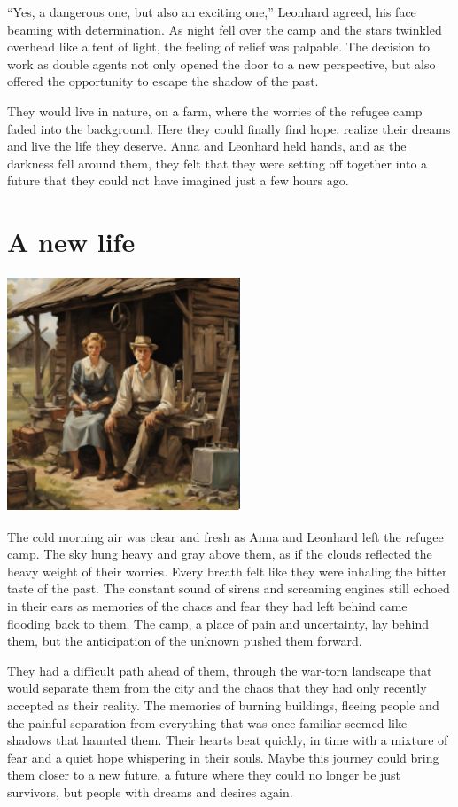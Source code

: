 \documentclass[
]{article}
\begin{document}
``Yes, a dangerous one, but also an exciting one,'' Leonhard agreed, his
face beaming with determination. As night fell over the camp and the
stars twinkled overhead like a tent of light, the feeling of relief was
palpable. The decision to work as double agents not only opened the door
to a new perspective, but also offered the opportunity to escape the
shadow of the past.

They would live in nature, on a farm, where the worries of the refugee
camp faded into the background. Here they could finally find hope,
realize their dreams and live the life they deserve. Anna and Leonhard
held hands, and as the darkness fell around them, they felt that they
were setting off together into a future that they could not have
imagined just a few hours ago.

\section{A new life}\label{a-new-life}

\includegraphics[width=2.73958in,height=2.77083in]{media/image0007.png}

The cold morning air was clear and fresh as Anna and Leonhard left the
refugee camp. The sky hung heavy and gray above them, as if the clouds
reflected the heavy weight of their worries. Every breath felt like they
were inhaling the bitter taste of the past. The constant sound of sirens
and screaming engines still echoed in their ears as memories of the
chaos and fear they had left behind came flooding back to them. The
camp, a place of pain and uncertainty, lay behind them, but the
anticipation of the unknown pushed them forward.

They had a difficult path ahead of them, through the war-torn landscape
that would separate them from the city and the chaos that they had only
recently accepted as their reality. The memories of burning buildings,
fleeing people and the painful separation from everything that was once
familiar seemed like shadows that haunted them. Their hearts beat
quickly, in time with a mixture of fear and a quiet hope whispering in
their souls. Maybe this journey could bring them closer to a new future,
a future where they could no longer be just survivors, but people with
dreams and desires again.
\end{document}

